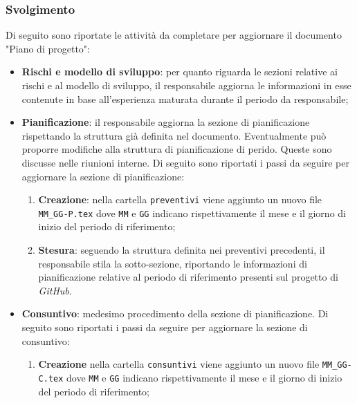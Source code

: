 \subsubsection{Svolgimento}
Di seguito sono riportate le attività da completare per aggiornare il documento
"Piano di progetto":
\begin{itemize}
	\item \textbf{Rischi e modello di sviluppo}: per quanto riguarda le sezioni
	      relative ai rischi e al modello di sviluppo, il responsabile aggiorna
	      le informazioni in esse contenute in base all'esperienza maturata
	      durante il periodo da responsabile;

	\item \textbf{Pianificazione}: il responsabile aggiorna la sezione di
	      pianificazione rispettando la struttura già definita nel documento.
	      Eventualmente può proporre modifiche alla struttura di pianificazione
	      di perido. Queste sono discusse nelle riunioni interne.
	      Di seguito sono riportati i passi da seguire per aggiornare la sezione
	      di pianificazione:
	      \begin{enumerate}
		      \item \textbf{Creazione}: nella cartella \texttt{preventivi} viene
		            aggiunto un nuovo file \texttt{MM\_GG-P.tex} dove
		            \texttt{MM} e \texttt{GG} indicano rispettivamente il mese e
		            il giorno di inizio del periodo di riferimento;

		      \item \textbf{Stesura}: seguendo la struttura definita nei
		            preventivi precedenti, il responsabile stila la
		            sotto-sezione, riportando le informazioni di pianificazione
		            relative al periodo di riferimento presenti sul progetto di
		            \textit{GitHub\g}.
	      \end{enumerate}

	\item \textbf{Consuntivo}: medesimo procedimento della sezione di
	      pianificazione. Di seguito sono riportati i passi da seguire per
	      aggiornare la sezione di consuntivo:
	      \begin{enumerate}
		      \item \textbf{Creazione} nella cartella \texttt{consuntivi} viene
		            aggiunto un nuovo file \texttt{MM\_GG-C.tex} dove
		            \texttt{MM} e \texttt{GG} indicano rispettivamente il mese e
		            il giorno di inizio del periodo di riferimento;


\end{enumerate}
\end{itemize}
